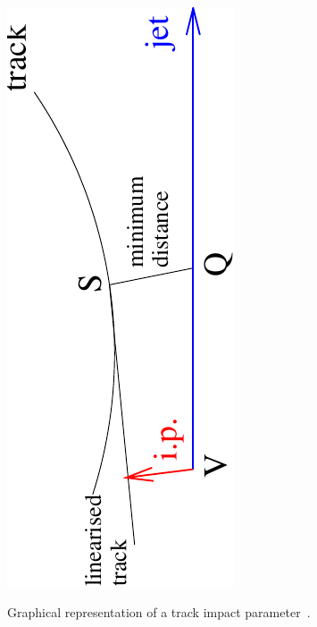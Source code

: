 \begin{figure}[hbtp]
   \centering
     \includegraphics[width=\textwidth]{Chapters/02_Detector/Images/impact_parameter}\\
     \caption{Graphical representation of a track impact parameter~\cite{CMS-PAS-BTV-09-001}.}
     \label{fig:impact_parameter}
\end{figure}

